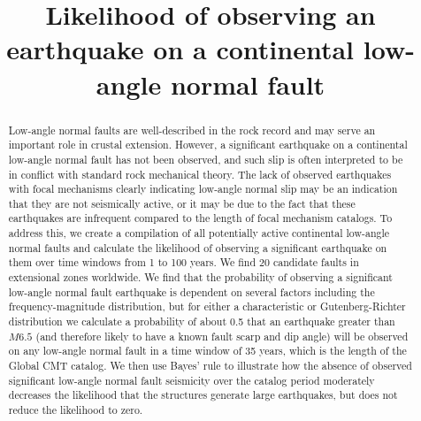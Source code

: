 \documentclass[twocolumn,grl]{AGUTeX}
\begin{document}
\title{Likelihood of observing an earthquake on a continental 
	   low-angle normal fault}



\begin{abstract}
Low-angle normal faults are well-described in the rock record and may serve an
important role in crustal extension.  However, a significant earthquake on
a continental low-angle normal fault has not been observed, and such slip is
often interpreted to be in conflict with standard rock mechanical theory. The
lack of observed earthquakes with focal mechanisms clearly indicating low-angle
normal slip may be an indication that they are not seismically active, or it
may be due to the fact that these earthquakes are infrequent compared to the
length of focal mechanism catalogs. To address this, we create a compilation of all
potentially active continental low-angle normal faults and calculate the
likelihood of observing a significant earthquake on them over time windows from
1 to 100 years. We find 20 candidate faults in extensional zones worldwide.  We
find that the probability of observing a significant low-angle normal fault
earthquake is dependent on several factors including the frequency-magnitude
distribution, but for either a characteristic or Gutenberg-Richter distribution
we calculate a probability of about 0.5 that an earthquake greater than $M6.5$ (and
therefore likely to have a known fault scarp and dip angle) will be observed on
any low-angle normal fault in a time window of 35 years, which is the length of
the Global CMT catalog. We then use Bayes' rule to illustrate how the absence
of observed significant low-angle normal fault seismicity over the catalog
period moderately decreases the likelihood that the structures generate
large earthquakes, but does not reduce the likelihood to zero.


\end{abstract}
\end{document}
